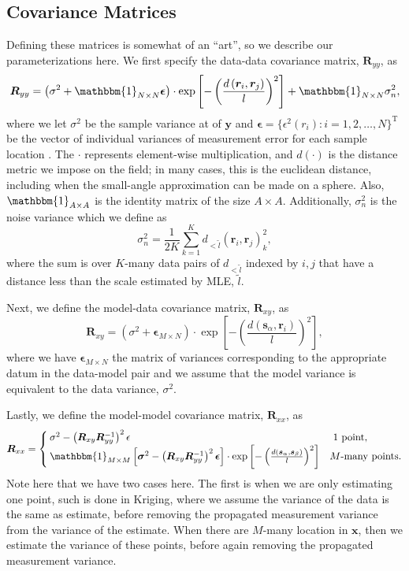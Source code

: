 \documentclass[12pt]{article}
\begin{document}
\subsection*{Covariance Matrices}
\label{sec:covariance}

Defining these matrices is somewhat of an ``art'', so we describe our parameterizations here. 
We first specify the data-data covariance matrix, $\bm{R}_{yy}$, as
\[
	\bm{R}_{yy} = \left(\sigma^{2} + \mathbbm{1}_{N\times N}\bm{\epsilon}\right) \cdot \exp\left[-\left(\frac{d\left(\bm{r}_i, \bm{r}_j\right)}{l}\right)^{2}\right] + \mathbbm{1}_{N\times N}\sigma^{2}_n,
\]
where we let $\sigma^2$ be the sample variance at of $\bm{y}$ and  $\bm{\epsilon} = \{ \epsilon^{2}\left(r_{i}\right) : i = 1, 2, \ldots, N\}^{\textrm{T}}$ be the vector of individual variances of measurement error for each sample location \cite{christensen2011, webster2007}.
The $\cdot$ represents element-wise multiplication, and $d\left(\cdot\right)$ is the distance metric we impose on the field; 
in many cases, this is the euclidean distance, including when the small-angle approximation can be made on a sphere. 
Also, $\mathbbm{1}_{A\times A}$ is the identity matrix of the size $A \times A$.
Additionally, $\sigma^{2}_n$ is the noise variance which we define as \cite{bindoff1992}
\[
	\sigma^{2}_n = \frac{1}{2K}\sum_{k=1}^K d_{<\tilde{l}}\left(\bm{r}_i, \bm{r}_j\right)_k^{2},
\]
where the sum is over $K$-many data pairs of $d_{<\tilde{l}}$ indexed by $i, j$ that have a distance less than the scale estimated by MLE, $\tilde{l}$.
\par
Next, we define the model-data covariance matrix, $\bm{R}_{xy}$, as
\[
	\bm{R}_{xy} = \left(\sigma^{2} + \bm{\epsilon}_{M \times N}\right) \cdot \exp\left[-\left(\frac{d\left(\bm{s}_{\alpha}, \bm{r}_i\right)}{l}\right)^{2}\right],
\]
where we have $\bm{\epsilon}_{M \times N}$ the matrix of variances corresponding to the appropriate datum in the data-model pair and we assume that the model variance is equivalent to the data variance, $\sigma^{2}.$
\par
Lastly, we define the model-model covariance matrix, $\bm{R}_{xx}$, as \cite{webster2007}
\[
	\bm{R}_{xx} = \begin{cases}
		      		\sigma^{2} - \left(\bm{R}_{xy}\bm{R}_{yy}^{-1}\right)^{2}\epsilon & \textrm{ 1 point,} \\
				\mathbbm{1}_{M \times M}\left[\bm{\sigma}^{2} - \left(\bm{R}_{xy}\bm{R}_{yy}^{-1}\right)^{2}\bm{\epsilon}\right] \cdot \exp\left[-\left(\frac{d\left(\bm{s}_{\alpha}, \bm{s}_{\beta}\right)}{l}\right)^{2}\right] & M\textrm{-many points}.
		      \end{cases}
\]
Note here that we have two cases here. 
The first is when we are only estimating one point, such is done in Kriging, where we assume the variance of the data is the same as estimate, before removing the propagated measurement variance from the variance of the estimate.
When there are $M$-many location in $\bm{x}$, then we estimate the variance of these points, before again removing the propagated measurement variance.
\end{document}
